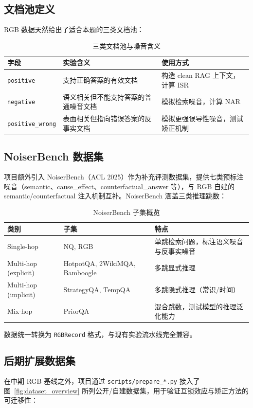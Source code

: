 \documentclass[UTF8,zihao=-4]{ctexart}
\begin{document}
\subsection{文档池定义}
RGB 数据天然给出了适合本题的三类文档池：

\begin{table}[H]
  \centering
  \caption{三类文档池与噪音含义}
  \begin{tabularx}{\textwidth}{lYY}
    \toprule
    字段 & 实验含义 & 使用方式 \\
    \midrule
    \texttt{positive} & 支持正确答案的有效文档 & 构造 clean RAG 上下文，计算 ISR \\
    \texttt{negative} & 语义相关但不能支持答案的普通噪音文档 & 模拟检索噪音，计算 NAR \\
    \texttt{positive\_wrong} & 表面相关但指向错误答案的反事实文档 & 模拟更强误导性噪音，测试矫正机制 \\
    \bottomrule
  \end{tabularx}
\end{table}

\subsection{NoiserBench 数据集}
项目额外引入 NoiserBench（ACL 2025）作为补充评测数据集，提供七类预标注噪音（semantic、cause\_effect、counterfactual\_answer 等），与 RGB 自建的 semantic/counterfactual 注入机制互补。NoiserBench 涵盖三类推理跳数：

\begin{table}[H]
  \centering
  \caption{NoiserBench 子集概览}
  \begin{tabularx}{\textwidth}{llY}
    \toprule
    类别 & 子集 & 特点 \\
    \midrule
    Single-hop & NQ, RGB & 单跳检索问题，标注语义噪音与反事实噪音 \\
    Multi-hop (explicit) & HotpotQA, 2WikiMQA, Bamboogle & 多跳显式推理 \\
    Multi-hop (implicit) & StrategyQA, TempQA & 多跳隐式推理（常识/时间） \\
    Mix-hop & PriorQA & 混合跳数，测试模型的推理泛化能力 \\
    \bottomrule
  \end{tabularx}
\end{table}

数据统一转换为 \texttt{RGBRecord} 格式，与现有实验流水线完全兼容。

\subsection{后期扩展数据集}
在中期 RGB 基线之外，项目通过 \texttt{scripts/prepare\_*.py} 接入了图~\ref{fig:dataset_overview} 所列公开/自建数据集，用于验证互锁效应与矫正方法的可迁移性：
\end{document}

